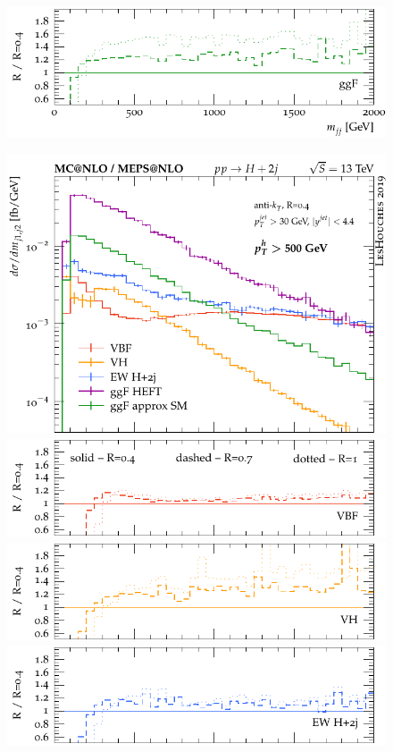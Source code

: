 \documentclass[10pt,prd,fleqn,superscriptaddress,notitlepage,nofootinbib,preprintnumbers,nobalancelastpage]{revtex4-1}
\begin{document}
\begin{figure}[p]
\begin{minipage}{.2925\textwidth}
    \includegraphics[width=\textwidth]{figures/channels/m_jj12_pth200_rGGH.pdf}
  \end{minipage}\hfill
  \begin{minipage}{.2925\textwidth}
    \includegraphics[width=\textwidth]{figures/channels/m_jj12_pth500.pdf}
    \includegraphics[width=\textwidth]{figures/channels/m_jj12_pth500_rVBF.pdf}
    \includegraphics[width=\textwidth]{figures/channels/m_jj12_pth500_rVH.pdf}
    \includegraphics[width=\textwidth]{figures/channels/m_jj12_pth500_rHJJ.pdf}

\end{minipage}
\end{figure}
\end{document}

